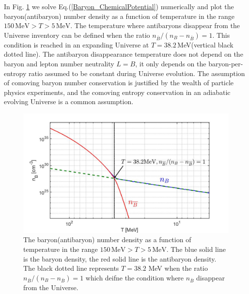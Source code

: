 \documentclass[universe,article,submit,moreauthors,pdftex,a4paper]{Definitions/mdpi}
\begin{document}
In Fig. \ref{Baryon_fig} we solve Eq.(\ref{Baryon_ChemicalPotential}) numerically and plot the baryon(antibaryon) number density as a function of temperature in the range $150\,\mathrm{MeV}>T>5\,\mathrm{MeV}$. The temperature where antibaryons disappear from the Universe inventory can be defined when the ratio $n_{\overline B}/(n_B-n_{\overline B})=1$. This condition is reached in an expanding Universe at $T=38.2$\,MeV(vertical black dotted line). The antibaryon disappearance temperature does not depend on the baryon and lepton number neutrality $L=B$, it only depends on the baryon-per-entropy ratio assumed to be constant during Universe evolution. The assumption of comoving baryon number conservation is justified by the wealth of particle physics experiments, and the comoving entropy conservation in an adiabatic evolving Universe is a common assumption.
\begin{figure} [h]
\centering
\includegraphics[width=\linewidth]{Baryon_Antibaryon_cm.jpg}
\caption{The baryon(antibaryon) number density as a function of temperature in the range $150\,\mathrm{MeV}>T>5\,\mathrm{MeV}$. The blue solid line is the baryon density, the red solid line is the antibaryon density. The black dotted line represents $T=38.2$ MeV  when the ratio $n_{\overline B}/(n_B-n_{\overline B})=1$ which deifne the condition where $n_{\overline B} $ disappear from the Universe.}
\label{Baryon_fig}
\end{figure}
\end{document}
